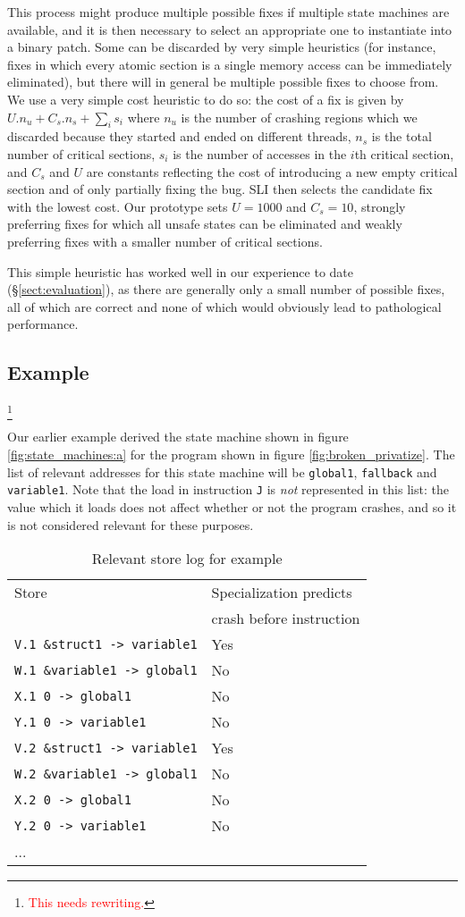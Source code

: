 \documentclass[10pt,twocolumn,preprint,natbib,authoryear]{sigplanconf}
\newcommand{\editorial}[1]{\textcolor{red}{\footnote{\textcolor{red}{#1}}}}
\begin{document}
This process might produce multiple possible fixes if multiple state
machines are available, and it is then necessary to select an
appropriate one to instantiate into a binary patch.  Some can be
discarded by very simple heuristics (for instance, fixes in which
every atomic section is a single memory access can be immediately
eliminated), but there will in general be multiple possible fixes to
choose from.  We use a very simple cost heuristic to do so: the cost
of a fix is given by $U.n_u + C_s.n_s + {\sum_{i}}s_i$ where $n_u$ is
the number of crashing regions which we discarded because they started
and ended on different threads, $n_s$ is the total number of critical
sections, $s_i$ is the number of accesses in the $i$th critical
section, and $C_s$ and $U$ are constants reflecting the cost of
introducing a new empty critical section and of only partially fixing
the bug.  SLI then selects the candidate fix with the lowest cost.
Our prototype sets $U=1000$ and $C_s=10$, strongly preferring fixes
for which all unsafe states can be eliminated and weakly preferring
fixes with a smaller number of critical sections.

This simple heuristic has worked well in our experience to date
(\S\ref{sect:evaluation}), as there are generally only a small number
of possible fixes, all of which are correct and none of which would
obviously lead to pathological performance.

\subsection{Example}\editorial{This needs rewriting.}
\label{sect:final_example}

Our earlier example derived the state machine shown in figure
\ref{fig:state_machines:a} for the program shown in figure
\ref{fig:broken_privatize}.  The list of relevant addresses for this
state machine will be \verb|global1|, \verb|fallback| and
\verb|variable1|.  Note that the load in instruction \verb|J| is
\emph{not} represented in this list: the value which it loads does not
affect whether or not the program crashes, and so it is not considered
relevant for these purposes.

\begin{table}
\begin{tabular}{ll}
 Store & Specialization predicts \\
       & crash before instruction \\
\verb|V.1 &struct1 -> variable1| & Yes\\
\verb|W.1 &variable1 -> global1| & No\\
\verb|X.1 0 -> global1| & No\\
\verb|Y.1 0 -> variable1| & No\\
\verb|V.2 &struct1 -> variable1| & Yes\\
\verb|W.2 &variable1 -> global1| & No\\
\verb|X.2 0 -> global1| & No\\
\verb|Y.2 0 -> variable1| & No\\
...
\end{tabular}
\caption{Relevant store log for example}
\label{tab:relevant_stores}
\end{table}
\end{document}
